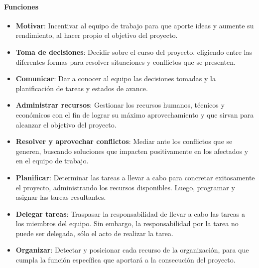 \paragraph{Funciones}
            \begin{itemize}
                \item \textbf{Motivar}:
                Incentivar al equipo de trabajo para que aporte ideas y aumente su rendimiento, al hacer propio el objetivo del proyecto.
                
                \item \textbf{Toma de decisiones}:
                Decidir sobre el curso del proyecto, eligiendo entre las diferentes formas para resolver situaciones y conflictos que se presenten.
                
                \item \textbf{Comunicar}:
                Dar a conocer al equipo las decisiones tomadas y la planificación de tareas y estados de avance.
                
                \item \textbf{Administrar recursos}:
                Gestionar los recursos humanos, técnicos y económicos con el fin de lograr su máximo aprovechamiento y que sirvan para alcanzar el objetivo del proyecto.
                
                \item \textbf{Resolver y aprovechar conflictos}:
                Mediar ante los conflictos que se generen, buscando soluciones que impacten positivamente en los afectados y en el equipo de trabajo.
                
                \item \textbf{Planificar}:
                Determinar las tareas a llevar a cabo para concretar exitosamente el proyecto, administrando los recursos disponibles.
                Luego, programar y asignar las tareas resultantes.
                
                \item \textbf{Delegar tareas}:
                Traspasar la responsabilidad de llevar a cabo las tareas a los miembros del equipo.
                Sin embargo, la responsabilidad por la tarea no puede ser delegada, sólo el acto de realizar la tarea.
                
                \item \textbf{Organizar}:
                Detectar y posicionar cada recurso de la organización, para que cumpla la función específica que aportará a la consecución del proyecto.
                

\end{itemize}
